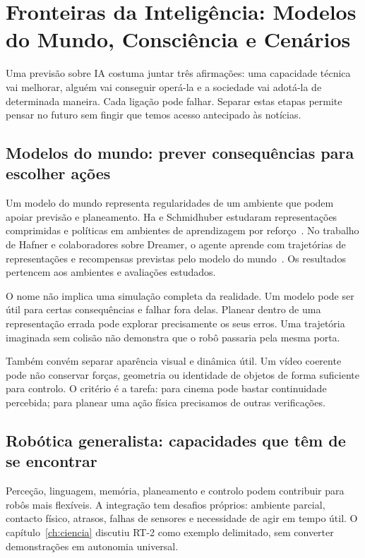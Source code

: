 \chapter{Fronteiras da Inteligência: Modelos do Mundo, Consciência e Cenários}
\label{ch:fronteiras}

Uma previsão sobre IA costuma juntar três afirmações: uma capacidade técnica vai melhorar, alguém vai conseguir operá-la e a sociedade vai adotá-la de determinada maneira. Cada ligação pode falhar. Separar estas etapas permite pensar no futuro sem fingir que temos acesso antecipado às notícias.

\section{Modelos do mundo: prever consequências para escolher ações}
Um modelo do mundo representa regularidades de um ambiente que podem apoiar previsão e planeamento. Ha e Schmidhuber estudaram representações comprimidas e políticas em ambientes de aprendizagem por reforço~\citep{ha2018}. No trabalho de Hafner e colaboradores sobre Dreamer, o agente aprende com trajetórias de representações e recompensas previstas pelo modelo do mundo~\citep{hafner2025}. Os resultados pertencem aos ambientes e avaliações estudados.

O nome não implica uma simulação completa da realidade. Um modelo pode ser útil para certas consequências e falhar fora delas. Planear dentro de uma representação errada pode explorar precisamente os seus erros. Uma trajetória imaginada sem colisão não demonstra que o robô passaria pela mesma porta.

Também convém separar aparência visual e dinâmica útil. Um vídeo coerente pode não conservar forças, geometria ou identidade de objetos de forma suficiente para controlo. O critério é a tarefa: para cinema pode bastar continuidade percebida; para planear uma ação física precisamos de outras verificações.

\section{Robótica generalista: capacidades que têm de se encontrar}
Perceção, linguagem, memória, planeamento e controlo podem contribuir para robôs mais flexíveis. A integração tem desafios próprios: ambiente parcial, contacto físico, atrasos, falhas de sensores e necessidade de agir em tempo útil. O capítulo~\ref{ch:ciencia} discutiu RT-2 como exemplo delimitado, sem converter demonstrações em autonomia universal.

